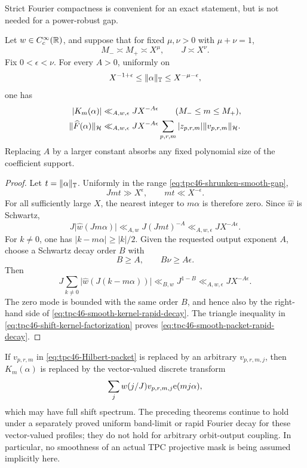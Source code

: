 Strict Fourier compactness is convenient for an exact statement, but
is not needed for a power-robust gap.

\begin{theorem}
\label{thm:tpc46-rapid-smooth-shift-gap}
Let \(w\in C_c^\infty(\mathbb R)\), and suppose that for fixed
\(\mu,\nu>0\) with \(\mu+\nu=1\),
\begin{equation}
 M_-\asymp M_+\asymp X^\mu,
 \qquad J\asymp X^\nu.
 \label{eq:tpc46-general-MJ-scales}
\end{equation}
Fix \(0<\epsilon<\nu\).  For every \(A>0\), uniformly on
\begin{equation}
 X^{-1+\epsilon}
 \le\|\alpha\|_{\mathbb T}
 \le X^{-\mu-\epsilon},
 \label{eq:tpc46-shrunken-smooth-gap}
\end{equation}
one has
\begin{align}
 |K_m(\alpha)|
 &\ll_{A,w,\epsilon}JX^{-A\epsilon}
 \qquad(M_-\le m\le M_+),
 \label{eq:tpc46-smooth-kernel-rapid-decay}\\
 \|\widehat F(\alpha)\|_{\mathcal H}
 &\ll_{A,w,\epsilon}
 JX^{-A\epsilon}
 \sum_{p,r,m}|z_{p,r,m}|\|v_{p,r,m}\|_{\mathcal H}.
 \label{eq:tpc46-smooth-packet-rapid-decay}
\end{align}
Replacing \(A\) by a larger constant absorbs any fixed polynomial
size of the coefficient support.
\end{theorem}

\begin{proof}
Let \(t=\|\alpha\|_{\mathbb T}\).  Uniformly in the range
\eqref{eq:tpc46-shrunken-smooth-gap},
\[
 Jmt\gg X^\epsilon,
 \qquad mt\ll X^{-\epsilon}.
\]
For all sufficiently large \(X\), the nearest integer to \(m\alpha\)
is therefore zero.  Since \(\widehat w\) is Schwartz,
\[
 J\bigl|\widehat w(Jm\alpha)\bigr|
 \ll_{A,w}J(Jmt)^{-A}
 \ll_{A,w,\epsilon}JX^{-A\epsilon}.
\]
For \(k\ne0\), one has
\(|k-m\alpha|\ge |k|/2\).  Given the requested output exponent \(A\),
choose a Schwartz decay order \(B\) with
\[
 B\ge A,
 \qquad B\nu\ge A\epsilon.
\]
Then
\[
 J\sum_{k\ne0}
 \bigl|\widehat w(J(k-m\alpha))\bigr|
 \ll_{B,w}J^{1-B}
 \ll_{A,w,\epsilon}JX^{-A\epsilon}.
\]
The zero mode is bounded with the same order \(B\), and hence also by
the right-hand side of
\eqref{eq:tpc46-smooth-kernel-rapid-decay}.  The triangle inequality in
\eqref{eq:tpc46-shift-kernel-factorization} proves
\eqref{eq:tpc46-smooth-packet-rapid-decay}.
\end{proof}

\begin{remark}
\label{rem:tpc46-j-independent-vectors}
If \(v_{p,r,m}\) in \eqref{eq:tpc46-Hilbert-packet} is replaced
by an arbitrary \(v_{p,r,m,j}\), then \(K_m(\alpha)\) is replaced by
the vector-valued discrete transform
\[
 \sum_jw(j/J)v_{p,r,m,j}\mathrm e(mj\alpha),
\]
which may have full shift spectrum.  The preceding theorems continue
to hold under a separately proved uniform band-limit or rapid Fourier
decay for these vector-valued profiles; they do not hold for arbitrary
orbit-output coupling.  In particular, no smoothness of an actual TPC
projective mask is being assumed implicitly here.
\end{remark}

